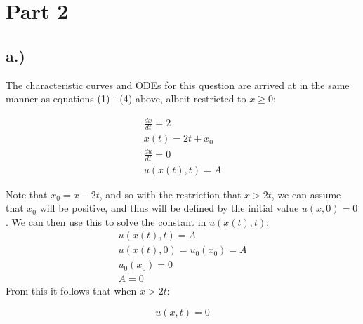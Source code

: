 \documentclass{article}
\begin{document}
\section*{Part 2}
\subsection*{a.)}
The characteristic curves and ODEs for this question are arrived at in the same manner as equations (1) - (4) above, albeit restricted to $x \geq 0$:
\begin{tcolorbox}[minipage,colback=white,arc=0pt,outer arc=0pt]
\begin{equation}
\begin{aligned}
\frac{dx}{dt} = 2\\
x(t) = 2t + x_0\\
\frac{du}{dt} = 0\\
u(x(t), t) = A
\end{aligned}
\end{equation}
\end{tcolorbox}
Note that $x_0 = x - 2t$, and so with the restriction that $x > 2t$, we can assume that $x_0$ will be positive, and thus will be defined by the initial value $u(x, 0) = 0$. We can then use this to solve the constant in $u(x(t), t)$:
\begin{equation}
\begin{aligned}
u(x(t), t) = A\\
u(x(t), 0) = u_0(x_0) = A\\
u_0(x_0) = 0\\
A = 0
\end{aligned}
\end{equation}
From this it follows that when $x > 2t$:
\begin{tcolorbox}[minipage,colback=white,arc=0pt,outer arc=0pt]
\begin{equation}
u(x, t) = 0
\end{equation}
\end{tcolorbox}
\end{document}
